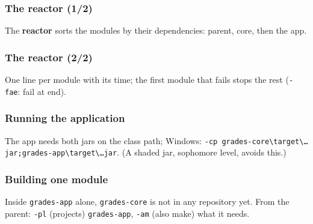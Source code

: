 \documentclass[aspectratio=169,10pt,compress]{beamer}
\begin{document}
\begin{frame}[t,fragile] \frametitle{The reactor (1/2)}

  \vspace{0.1em}
  \small The \textbf{reactor} sorts the modules by their dependencies: parent, core, then the app.
\end{frame}




\begin{frame}[t,fragile] \frametitle{The reactor (2/2)}

  \vspace{0.1em}
  \small One line per module with its time; the first module that fails stops the rest (\texttt{-fae}: fail at end).
\end{frame}




\begin{frame}[t,fragile] \frametitle{Running the application}

  \vspace{0.1em}
  \small
  The app needs both jars on the class path; Windows: \texttt{-cp grades-core\textbackslash target\textbackslash \dots jar;grades-app\textbackslash target\textbackslash \dots jar}. (A shaded jar, sophomore level, avoids this.)
\end{frame}





\begin{frame}[t,fragile] \frametitle{Building one module}

  \vspace{0.1em}
  \small
  Inside \texttt{grades-app} alone, \texttt{grades-core} is not in any repository yet. From the parent: \texttt{-pl} (projects) \texttt{grades-app}, \texttt{-am} (also make) what it needs.
\end{frame}
\end{document}

